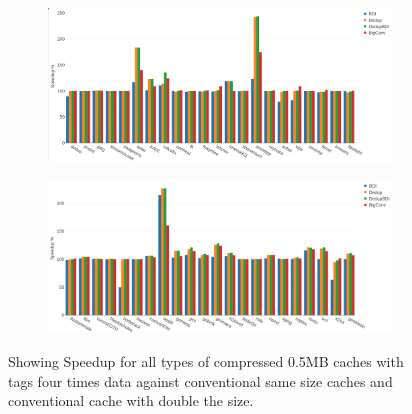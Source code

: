 \begin{figure}
    \begin{subfigure}{\textwidth}
        \includegraphics[width=\textwidth]{all5-speedup1.png}
    \end{subfigure}
    \begin{subfigure}{\textwidth}
        \includegraphics[width=\textwidth]{all5-speedup2.png}
    \end{subfigure}
    \caption[All benchmarks: 0.5MB Speedup]{Showing Speedup for all types of compressed 0.5MB caches with tags four times data against conventional same size caches and conventional cache with double the size.}
    \label{fig:all_speedup1}
\end{figure}
